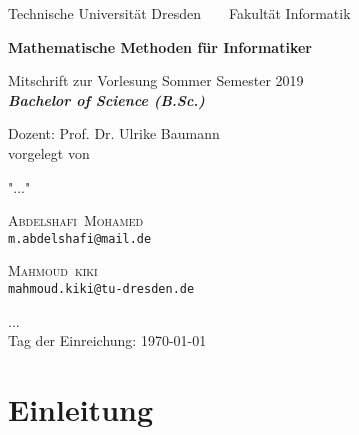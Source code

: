 \documentclass[a4paper,12pt,leqno]{report}
\makeatletter
\newcommand{\nameE}{Mohamed}
\newcommand{\vornameE}{Abdelshafi}
\newcommand{\emailE}{m.abdelshafi@mail.de}
\newcommand{\nameS}{kiki}
\newcommand{\vornameS}{Mahmoud}
\newcommand{\emailS}{mahmoud.kiki@tu-dresden.de}
\theoremstyle{plain} %
\theoremstyle{definition} %
\newcommand{\thema}{Mathematische Methoden für Informatiker}
\newcommand{\datum}{\today}%
\makeatother
\begin{document}




	\thispagestyle{empty}


    \begin{center}
    {\Large
    Technische Universit\"{a}t Dresden\  \ \textbullet\ \ Fakult\"{a}t Informatik
    }

        \vfil

        {\bfseries\Huge\thema}

        \vfil

        {\LARGE
Mitschrift zur Vorlesung Sommer Semester 2019  \\[\bigskipamount]

        \bfseries{\itshape Bachelor of Science  \textup{(}B.Sc.\textup{)}}\\[\bigskipamount]
        }%

        \vfil\vfil\vfil
        Dozent: Prof. Dr. Ulrike Baumann \\
        vorgelegt von\\
        \item "..." \\
        \item \textsc{\vornameE\ \nameE } \\ \texttt{\emailE} \\  \item
        \textsc{\vornameS\ \nameS \qquad } \\ \texttt{\emailS}  \\
        \item ... \\
        Tag der Einreichung: \datum\\[\bigskipamount]

    \end{center}


    \cleardoublepage



    \tableofcontents

    \thispagestyle{empty}



    \setcounter{page}{0}
    \chapter*{Einleitung}
\end{document}
